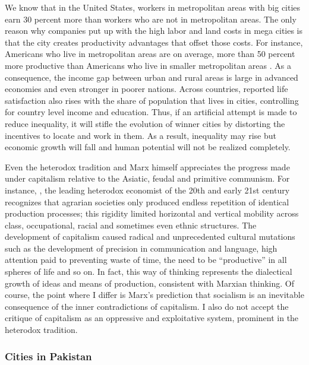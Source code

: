 \documentclass[12pt]{article}
\newcommand{\1}{\mathbbm 1}
\begin{document}
		
		We know that in the United States, workers in metropolitan areas with big cities earn 30 percent more than workers who are not in metropolitan areas. The only reason why
		companies put up with the high labor and land costs in mega cities is that the city creates productivity advantages that offset those costs. For instance, Americans who live in metropolitan areas are on average, more than 50 percent more productive than Americans who live in smaller metropolitan areas \cite{glaeser2013triumph}. As a consequence, the income gap between urban and rural areas is large in advanced economies and even stronger in poorer nations. Across countries, reported life satisfaction also rises with the share of population that lives in cities, controlling for country level income and education.
		Thus, if an artificial attempt is made to reduce inequality, it will stifle the evolution of winner cities by distorting the incentives to locate and work in them. As a result, inequality may rise but economic growth will fall and human potential will not be realized completely.
		
		
		Even the heterodox tradition and Marx himself appreciates the progress made under capitalism relative to the Asiatic, feudal and primitive communism. For instance, \cite{bowles2012new}, the leading heterodox economist of the 20th and early 21st century recognizes that agrarian societies only produced endless repetition of identical production processes; this rigidity limited horizontal and vertical mobility across class, occupational, racial and sometimes even ethnic structures. The development of capitalism caused radical and unprecedented cultural mutations such as the development of precision in communication and language, high attention paid to preventing waste of time, the need to be ``productive'' in all spheres of life and so on. In fact, this way of thinking represents the dialectical growth of ideas and means of production, consistent with Marxian thinking. Of course, the point where I differ is Marx's prediction that socialism is an inevitable consequence of the inner contradictions of capitalism. I also do not accept the critique of capitalism as an oppressive and exploitative system, prominent in the heterodox tradition. 
		
		
		  
	
	

		\subsubsection{Cities in Pakistan}
		
\end{document}
